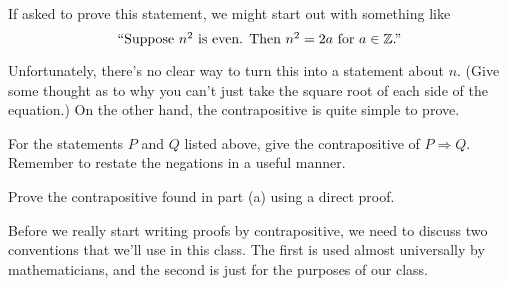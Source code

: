 If asked to prove this statement, we might start out with something like 
\[\mbox{``Suppose $n^2$ is even.  Then $n^2=2a$ for $a \in \mathbb{Z}$.''}\]

Unfortunately, there's no clear way to turn this into a statement about $n$.  (Give some thought as to why you can't just take the square root of each side of the equation.)  On the other hand, the contrapositive is quite simple to prove.
	\begin{question}[resume]
		\item \begin{qpart}
		\item  For the statements $P$ and $Q$ listed above, give the contrapositive of $P \Rightarrow Q$.  Remember to restate the negations in a useful manner.
		\newpage
		\item Prove the contrapositive found in part (a) using a direct proof.
		\vspace{3in}
		\end{qpart}
	\end{question}
	
\noindent Before we really start writing proofs by contrapositive, we need to discuss two conventions that we'll use in this class.  The first is used almost universally by mathematicians, and the second is just for the purposes of our class.\\

